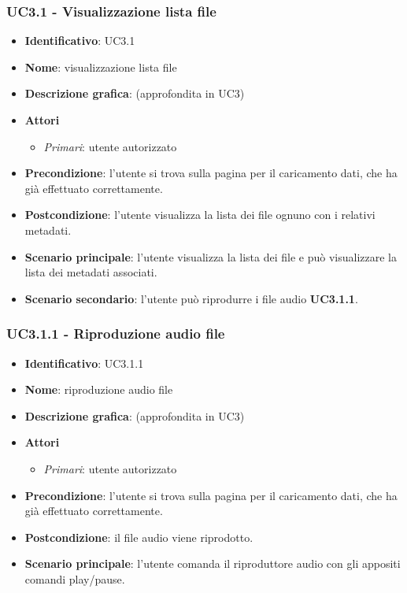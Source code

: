 \subsubsection{UC3.1 - Visualizzazione lista file}
\begin{itemize}
  \item \textbf{Identificativo}: UC3.1
  \item \textbf{Nome}: visualizzazione lista file
  \item \textbf{Descrizione grafica}: (approfondita in UC3)
  \item \textbf{Attori}
        \begin{itemize}
          \item \textit{Primari}: utente autorizzato
        \end{itemize}
  \item \textbf{Precondizione}: l'utente si trova sulla pagina per il caricamento dati, che ha già effettuato correttamente.
  \item \textbf{Postcondizione}: l'utente visualizza la lista dei file ognuno con i relativi metadati.
  \item \textbf{Scenario principale}: l'utente visualizza la lista dei file e può visualizzare la lista dei metadati associati.
  \item \textbf{Scenario secondario}: l'utente può riprodurre i file audio \textbf{UC3.1.1}.
\end{itemize}

\subsubsection{UC3.1.1 - Riproduzione audio file}
\begin{itemize}
  \item \textbf{Identificativo}: UC3.1.1
  \item \textbf{Nome}: riproduzione audio file
  \item \textbf{Descrizione grafica}: (approfondita in UC3)
  \item \textbf{Attori}
        \begin{itemize}
          \item \textit{Primari}: utente autorizzato
        \end{itemize}
  \item \textbf{Precondizione}: l'utente si trova sulla pagina per il caricamento dati, che ha già effettuato correttamente.
  \item \textbf{Postcondizione}: il file audio viene riprodotto.
  \item \textbf{Scenario principale}: l'utente comanda il riproduttore audio con gli appositi comandi play/pause.
\end{itemize}
\newpage